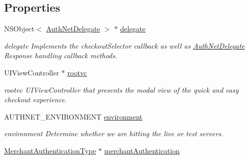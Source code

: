 \subsection*{Properties}
\begin{DoxyCompactItemize}
\item 
\hypertarget{interface_auth_net_aab213bddd9479dd42193e3c9d1b333b7}{
NSObject$<$ \hyperlink{protocol_auth_net_delegate-p}{AuthNetDelegate} $>$ $\ast$ \hyperlink{interface_auth_net_aab213bddd9479dd42193e3c9d1b333b7}{delegate}}
\label{interface_auth_net_aab213bddd9479dd42193e3c9d1b333b7}

\begin{DoxyCompactList}\small\item\em delegate Implements the checkoutSelector callback as well as \hyperlink{protocol_auth_net_delegate-p}{AuthNetDelegate} Response handling callback methods. \item\end{DoxyCompactList}\item 
\hypertarget{interface_auth_net_a299efc78870696910facc396a05180c8}{
UIViewController $\ast$ \hyperlink{interface_auth_net_a299efc78870696910facc396a05180c8}{rootvc}}
\label{interface_auth_net_a299efc78870696910facc396a05180c8}

\begin{DoxyCompactList}\small\item\em rootvc UIViewController that presents the modal view of the quick and easy checkout experience. \item\end{DoxyCompactList}\item 
\hypertarget{interface_auth_net_a6392ca5496c66dd26ca4aabfd6df57b6}{
AUTHNET\_\-ENVIRONMENT \hyperlink{interface_auth_net_a6392ca5496c66dd26ca4aabfd6df57b6}{environment}}
\label{interface_auth_net_a6392ca5496c66dd26ca4aabfd6df57b6}

\begin{DoxyCompactList}\small\item\em environment Determine whether we are hitting the live or test servers. \item\end{DoxyCompactList}\item 
\hypertarget{interface_auth_net_a61248d0996e38a3962e4f17ce06c0233}{
\hyperlink{interface_merchant_authentication_type}{MerchantAuthenticationType} $\ast$ \hyperlink{interface_auth_net_a61248d0996e38a3962e4f17ce06c0233}{merchantAuthentication}}
\label{interface_auth_net_a61248d0996e38a3962e4f17ce06c0233}


\end{DoxyCompactItemize}
